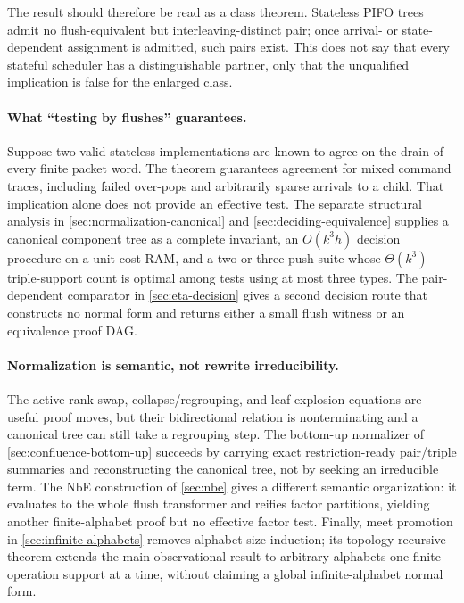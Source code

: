 The result should therefore be read as a class theorem.  Stateless PIFO trees
admit no flush-equivalent but interleaving-distinct pair; once arrival- or
state-dependent assignment is admitted, such pairs exist.  This does not say
that every stateful scheduler has a distinguishable partner, only that the
unqualified implication is false for the enlarged class.

\paragraph{What ``testing by flushes'' guarantees.}
Suppose two valid stateless implementations are known to agree on the drain of
every finite packet word.  The theorem guarantees agreement for mixed command
traces, including failed over-pops and arbitrarily sparse arrivals to a child.
That implication alone does not provide an effective test.  The separate
structural analysis in \autoref{sec:normalization-canonical} and
\autoref{sec:deciding-equivalence} supplies a canonical component tree as a
complete invariant, an \(O(k^3h)\) decision procedure on a unit-cost RAM, and
a two-or-three-push suite whose \(\Theta(k^3)\) triple-support count is optimal
among tests using at most three types.  The pair-dependent comparator in
\autoref{sec:eta-decision} gives a
second decision route that constructs no normal form and returns either a
small flush witness or an equivalence proof DAG.

\paragraph{Normalization is semantic, not rewrite irreducibility.}
The active rank-swap, collapse/regrouping, and leaf-explosion equations are
useful proof moves, but their bidirectional relation is nonterminating and a
canonical tree can still take a regrouping step.  The bottom-up normalizer of
\autoref{sec:confluence-bottom-up} succeeds by carrying exact restriction-ready
pair/triple summaries and reconstructing the canonical tree, not by seeking an
irreducible term.  The NbE construction of \autoref{sec:nbe} gives a different
semantic organization: it evaluates to the whole flush transformer and
reifies factor partitions, yielding another finite-alphabet proof but no
effective factor test.  Finally, meet promotion in
\autoref{sec:infinite-alphabets} removes alphabet-size induction; its
topology-recursive theorem extends the main observational result to arbitrary
alphabets one finite operation support at a time, without claiming a global
infinite-alphabet normal form.
